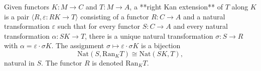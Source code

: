 Given functors $K: M \to C$ and $T: M \to A$, a **right Kan extension** of $T$ along $K$ is a pair $\langle R, \varepsilon: RK \to T \rangle$ consisting of a functor $R: C \to A$ and a natural transformation $\varepsilon$ such that for every functor $S: C \to A$ and every natural transformation $\alpha: SK \to T$, there is a unique natural transformation $\sigma: S \to R$ with $\alpha = \varepsilon \cdot \sigma K$. The assignment $\sigma \mapsto \varepsilon \cdot \sigma K$ is a bijection
$$\mathrm{Nat}(S, \mathrm{Ran}_K T) \cong \mathrm{Nat}(SK, T),$$
natural in $S$. The functor $R$ is denoted $\mathrm{Ran}_K T$.
